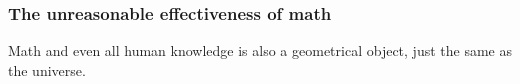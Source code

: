 \documentclass[aspectratio=169]{beamer}
\begin{document}
\begin{frame}
\frametitle{The unreasonable effectiveness of math}
Math and even all human knowledge is also a geometrical object, just the same as the universe.
\begin{figure}[ht]\centering
{}
\end{figure}
\end{frame}
\end{document}
